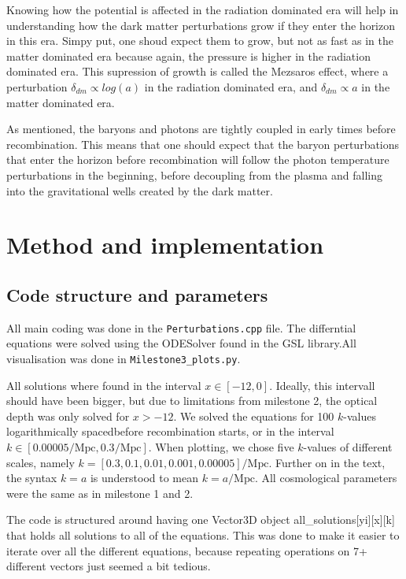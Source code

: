 \documentclass[12pt]{article}
\begin{document}
Knowing how the potential is affected in the radiation dominated era will help in understanding how the dark matter perturbations grow if they enter the horizon in this era. Simpy put, one shoud expect them to grow, but not as fast as in the matter dominated era because again, the pressure is higher in the radiation dominated era. This supression of growth is called the Mezsaros effect, where a perturbation $\delta_{dm}\propto log(a)$ in the radiation dominated era, and $\delta_{dm} \propto a$ in the matter dominated era.

As mentioned, the baryons and photons are tightly coupled in early times before recombination. This means that one should expect that the baryon perturbations that enter the horizon before recombination will follow the photon temperature perturbations in the beginning, before decoupling from the plasma and falling into the gravitational wells created by the dark matter. 



\section{Method and implementation}
\subsection{Code structure and parameters}
All main coding was done in the \texttt{Perturbations.cpp} file. The differntial equations were solved using the ODESolver found in the GSL library.All visualisation was done in \texttt{Milestone3\_plots.py}. 

All solutions where found in the interval $x\in[-12,0]$. Ideally, this intervall should have been bigger, but due to limitations from milestone 2, the optical depth was only solved for $x>-12$. We solved the equations for 100 $k$-values logarithmically spacedbefore recombination starts, or  in the interval $k\in[0.00005/\mathrm{Mpc}, 0.3/\mathrm{Mpc}]$. When plotting, we chose five $k$-values of different scales, namely $k=[0.3, 0.1,0.01,0.001,0.00005]/\mathrm{Mpc}$. Further on in the text, the syntax $k=a$ is understood to mean $k=a/\mathrm{Mpc}$. All cosmological parameters were the same as in milestone 1 and 2. 

The code is structured around having one Vector3D object all\_solutions[yi][x][k] that holds all solutions to all of the equations. This was done to make it easier to iterate over all the different equations, because repeating operations on 7+ different vectors just seemed a bit tedious.
\end{document}
